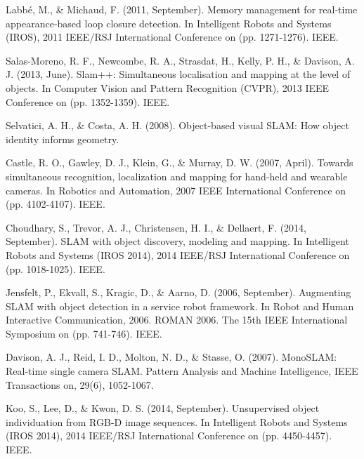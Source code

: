 \documentclass[twoside,hidelinks]{article}
\begin{document}
\begin{thebibliography}{9}
\newblock Labbé, M., \& Michaud, F. (2011, September). Memory management for real-time appearance-based loop closure detection. In Intelligent Robots and Systems (IROS), 2011 IEEE/RSJ International Conference on (pp. 1271-1276). IEEE.


\newblock Salas-Moreno, R. F., Newcombe, R. A., Strasdat, H., Kelly, P. H., \& Davison, A. J. (2013, June). Slam++: Simultaneous localisation and mapping at the level of objects. In Computer Vision and Pattern Recognition (CVPR), 2013 IEEE Conference on (pp. 1352-1359). IEEE.

\newblock Selvatici, A. H., \& Costa, A. H. (2008). Object-based visual SLAM: How object identity informs geometry.

\newblock Castle, R. O., Gawley, D. J., Klein, G., \& Murray, D. W. (2007, April). Towards simultaneous recognition, localization and mapping for hand-held and wearable cameras. In Robotics and Automation, 2007 IEEE International Conference on (pp. 4102-4107). IEEE.


\newblock Choudhary, S., Trevor, A. J., Christensen, H. I., \& Dellaert, F. (2014, September). SLAM with object discovery, modeling and mapping. In Intelligent Robots and Systems (IROS 2014), 2014 IEEE/RSJ International Conference on (pp. 1018-1025). IEEE.

\newblock Jensfelt, P., Ekvall, S., Kragic, D., \& Aarno, D. (2006, September). Augmenting SLAM with object detection in a service robot framework. In Robot and Human Interactive Communication, 2006. ROMAN 2006. The 15th IEEE International Symposium on (pp. 741-746). IEEE.

\newblock Davison, A. J., Reid, I. D., Molton, N. D., \& Stasse, O. (2007). MonoSLAM: Real-time single camera SLAM. Pattern Analysis and Machine Intelligence, IEEE Transactions on, 29(6), 1052-1067.

\newblock Koo, S., Lee, D., \& Kwon, D. S. (2014, September). Unsupervised object individuation from RGB-D image sequences. In Intelligent Robots and Systems (IROS 2014), 2014 IEEE/RSJ International Conference on (pp. 4450-4457). IEEE.





\end{thebibliography}
\end{document}
